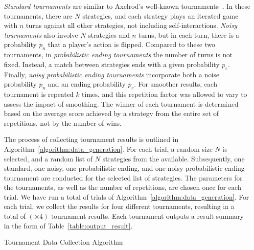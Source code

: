 \documentclass{article}
\newcommand{\uniquenumberofseeds}{}
\newcommand{\numberofalltournaments}{}
\newcommand{\numberofstrategies}{}
\begin{document}
{\it Standard tournaments} are similar to Axelrod's well-known
tournaments~\cite{Axelrod1980a}. In these tournaments, there are \(N\)
strategies, and each strategy plays an iterated game with \(n\) turns against
all other strategies, not including self-interactions.
{\it Noisy tournaments} also involve \(N\) strategies and \(n\) turns, but
in each turn, there is a probability \(p_n\) that a player's action is
flipped. Compared to these two tournaments, in 
{\it probabilistic ending tournaments} the number of turns is not fixed. Instead,
a match between strategies ends with a given probability
\(p_e\).
Finally, {\it noisy probabilistic ending tournaments} incorporate both a
noise probability \(p_n\) and an ending probability \(p_e\). For smoother
results, each tournament is repeated \(k\) times, and this repetition factor was
allowed to vary to assess the impact of smoothing. The winner of each tournament
is determined based on the average score achieved by a strategy from the entire
set of repetitions, not by the number of wins.

The process of collecting tournament results is outlined in
Algorithm~\ref{algorithm:data_generation}. For each trial, a random size \(N\)
is selected, and a random list of \(N\) strategies from the \numberofstrategies
available. Subsequently, one standard, one noisy, one probabilistic ending, and
one noisy probabilistic ending tournament are conducted for the selected list of
strategies. The parameters for the tournaments, as well as the number of
repetitions, are chosen once for each trial. We have run a total of
\uniquenumberofseeds trials of Algorithm~\ref{algorithm:data_generation}. For
each trial, we collect the results for four different tournaments, resulting in
a total of \numberofalltournaments $(\uniquenumberofseeds \times 4)$ tournament
results. Each tournament outputs a result summary in the form of
Table~\ref{table:output_result}.

\begin{algorithm}[!htbp]
    \;
    \caption{Tournament Data Collection Algorithm}
    \label{algorithm:data_generation}
\end{algorithm}
\end{document}
